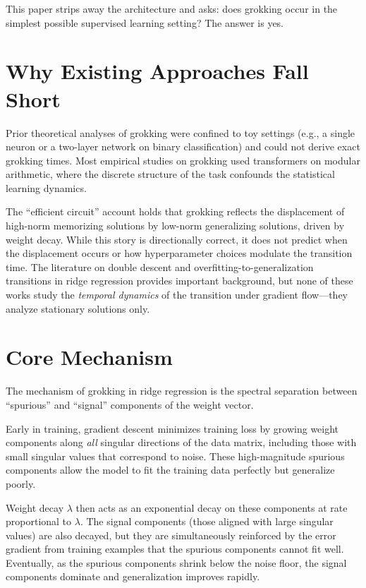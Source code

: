 \documentclass[10pt,twocolumn]{article}
\begin{document}
This paper strips away the architecture and asks: does grokking occur in
the simplest possible supervised learning setting? The answer is yes.

\section{Why Existing Approaches Fall Short}

Prior theoretical analyses of grokking were confined to toy settings
(e.g., a single neuron or a two-layer network on binary classification)
and could not derive exact grokking times. Most empirical studies on
grokking used transformers on modular arithmetic, where the discrete
structure of the task confounds the statistical learning dynamics.

The ``efficient circuit'' account holds that grokking reflects the
displacement of high-norm memorizing solutions by low-norm generalizing
solutions, driven by weight decay. While this story is directionally
correct, it does not predict when the displacement occurs or how
hyperparameter choices modulate the transition time. The literature
on double descent and overfitting-to-generalization transitions in ridge
regression provides important background, but none of these works
study the \emph{temporal dynamics} of the transition under gradient
flow---they analyze stationary solutions only.

\section{Core Mechanism}

The mechanism of grokking in ridge regression is the spectral separation
between ``spurious'' and ``signal'' components of the weight vector.

Early in training, gradient descent minimizes training loss by growing
weight components along \emph{all} singular directions of the data matrix,
including those with small singular values that correspond to noise.
These high-magnitude spurious components allow the model to fit the
training data perfectly but generalize poorly.

Weight decay $\lambda$ then acts as an exponential decay on these
components at rate proportional to $\lambda$. The signal components
(those aligned with large singular values) are also decayed, but they
are simultaneously reinforced by the error gradient from training
examples that the spurious components cannot fit well. Eventually,
as the spurious components shrink below the noise floor, the signal
components dominate and generalization improves rapidly.
\end{document}
